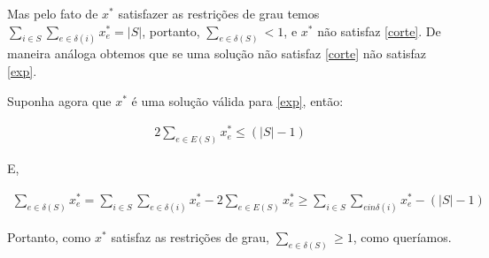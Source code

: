 \documentclass[11pt]{article}
\begin{document}
Mas pelo fato de $x^*$ satisfazer as restrições de grau temos $\sum_{i
  \in S}\sum_{e \in \delta (i)}x_e^* = |S|$, portanto, $\sum_{e \in
  \delta (S)} < 1$, e $x^*$ não satisfaz \eqref{corte}. De maneira
análoga obtemos que se uma solução não satisfaz \eqref{corte} não
satisfaz \eqref{exp}.

Suponha agora que $x^*$ é uma solução válida para \eqref{exp}, então:

\begin{align}
  2\sum_{e \in E(S)}x_e^* \le (|S| - 1)
\end{align}

E,

\begin{align}
  \sum_{e \in \delta (S)}x_e^* = \sum_{i \in S}\sum_{e \in \delta
    (i)}x_e^* - 2\sum_{e \in E(S)}x_e^* \ge \sum_{i \in S}\sum_{e in
    \delta (i)}x_e^* - (|S| - 1)
\end{align}

Portanto, como $x^*$ satisfaz as restrições de grau, $\sum_{e \in
  \delta (S)} \ge 1$, como queríamos.
\end{document}
